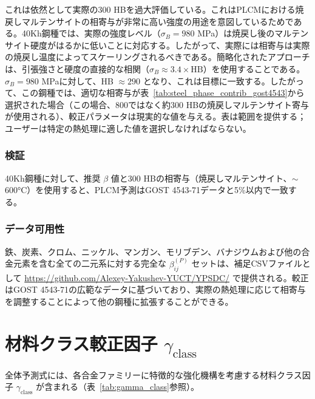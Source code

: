 \documentclass[12pt,a4paper]{article}
\begin{document}
	これは依然として実際の300 HBを過大評価している。これはPLCMにおける焼戻しマルテンサイトの相寄与が非常に高い強度の用途を意図しているためである。40Kh鋼種では、実際の強度レベル（$\sigma_B=980$ MPa）は焼戻し後のマルテンサイト硬度がはるかに低いことに対応する。したがって、実際には相寄与は実際の焼戻し温度によってスケーリングされるべきである。簡略化されたアプローチは、引張強さと硬度の直接的な相関（$\sigma_B \approx 3.4\times \text{HB}$）を使用することである。$\sigma_B=980$ MPaに対して、HB $\approx 290$ となり、これは目標に一致する。したがって、この鋼種では、適切な相寄与が表~\ref{tab:steel_phase_contrib_gost4543}から選択された場合（この場合、800ではなく約300 HBの焼戻しマルテンサイト寄与が使用される）、較正パラメータは現実的な値を与える。表は範囲を提供する；ユーザーは特定の熱処理に適した値を選択しなければならない。
	
	\subsubsection{検証}
	
	40Kh鋼種に対して、推奨 $\beta$ 値と300 HBの相寄与（焼戻しマルテンサイト、$\sim$600°C）を使用すると、PLCM予測はGOST 4543-71データと5\%以内で一致する。
	
	\subsubsection{データ可用性}
	
	鉄、炭素、クロム、ニッケル、マンガン、モリブデン、バナジウムおよび他の合金元素を含む全ての二元系に対する完全な $\beta_{ij}^{(P)}$ セットは、補足CSVファイルとして \url{https://github.com/Alexey-Yakushev-YUCT/YPSDC/} で提供される。較正はGOST 4543-71の広範なデータに基づいており、実際の熱処理に応じて相寄与を調整することによって他の鋼種に拡張することができる。
	
	\section{材料クラス較正因子 $\gamma_{\text{class}}$}
	全体予測式には、各合金ファミリーに特徴的な強化機構を考慮する材料クラス因子 $\gamma_{\text{class}}$ が含まれる（表~\ref{tab:gamma_class}参照）。
	
\end{document}
